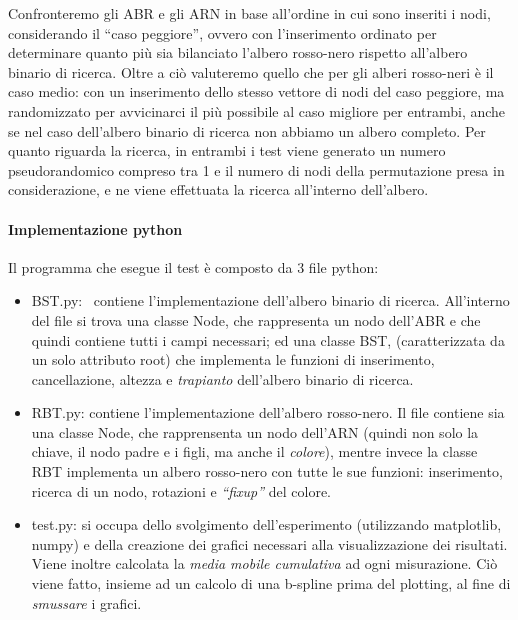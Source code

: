 \documentclass[
]{article}
\providecommand{\tightlist}{%
  \setlength{\itemsep}{0pt}\setlength{\parskip}{0pt}}
\begin{document}
Confronteremo gli ABR e gli ARN in base all'ordine in cui sono inseriti
i nodi, considerando il ``caso peggiore'', ovvero con l'inserimento
ordinato per determinare quanto più sia bilanciato l'albero rosso-nero
rispetto all'albero binario di ricerca. Oltre a ciò valuteremo quello
che per gli alberi rosso-neri è il caso medio: con un inserimento dello
stesso vettore di nodi del caso peggiore, ma randomizzato per
avvicinarci il più possibile al caso migliore per entrambi, anche se nel
caso dell'albero binario di ricerca non abbiamo un albero completo. Per
quanto riguarda la ricerca, in entrambi i test viene generato un numero
pseudorandomico compreso tra 1 e il numero di nodi della permutazione
presa in considerazione, e ne viene effettuata la ricerca all'interno
dell'albero.

\hypertarget{implementazione-python}{%
\paragraph{Implementazione python}\label{implementazione-python}}

Il programma che esegue il test è composto da 3 file python:

\begin{itemize}
\tightlist
\item
  BST.py: ~contiene l'implementazione dell'albero binario di ricerca.
  All'interno del file si trova una classe Node, che rappresenta un nodo
  dell'ABR e che quindi contiene tutti i campi necessari; ed una classe
  BST, (caratterizzata da un solo attributo root) che implementa le
  funzioni di inserimento, cancellazione, altezza e \emph{trapianto}
  dell'albero binario di ricerca.
\item
  RBT.py: contiene l'implementazione dell'albero rosso-nero. Il file
  contiene sia una classe Node, che rapprensenta un nodo dell'ARN
  (quindi non solo la chiave, il nodo padre e i figli, ma anche il
  \emph{colore}), mentre invece la classe RBT implementa un albero
  rosso-nero con tutte le sue funzioni: inserimento, ricerca di un nodo,
  rotazioni e \emph{``fixup''} del colore.
\item
  test.py: si occupa dello svolgimento dell'esperimento (utilizzando
  matplotlib, numpy) e della creazione dei grafici necessari alla
  visualizzazione dei risultati. Viene inoltre calcolata la \emph{media
  mobile cumulativa} ad ogni misurazione. Ciò viene fatto, insieme ad un
  calcolo di una b-spline prima del plotting, al fine di \emph{smussare}
  i grafici.
\end{itemize}
\end{document}
